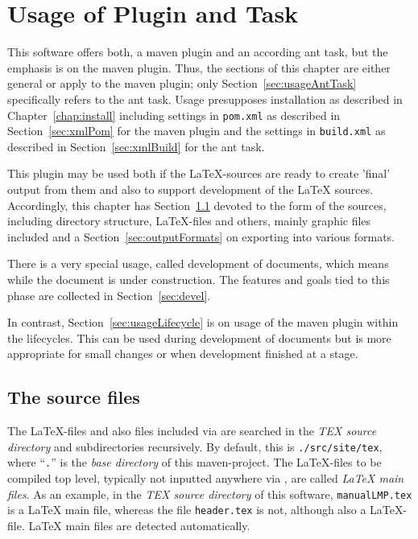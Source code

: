 
\chapter{Usage of Plugin and Task}\label{chap:usage}

This software offers both, a maven plugin and an according ant task,
but the emphasis is on the maven plugin.
Thus, the sections of this chapter are either general
or apply to the maven plugin;
only Section~\ref{sec:usageAntTask} specifically refers to the ant task. 
Usage presupposes installation as described in Chapter~\ref{chap:install}
including settings in \texttt{pom.xml} 
as described in Section~\ref{sec:xmlPom} for the maven plugin 
and the settings in \texttt{build.xml} 
as described in Section~\ref{sec:xmlBuild} for the ant task.

This plugin may be used both if the \LaTeX-sources are ready 
to create 'final' output from them 
and also to support development of the \LaTeX{} sources. 
Accordingly, this chapter has Section~\ref{sec:sources}
devoted to the form of the sources, including directory structure,
\LaTeX-files and others, mainly graphic files included
and a Section~\ref{sec:outputFormats} on exporting into various formats.

There is a very special usage, called development of documents,
which means while the document is under construction.
The features and goals tied to this phase
are collected in Section~\ref{sec:devel}.

In contrast, Section~\ref{sec:usageLifecycle}
is on usage of the maven plugin within the lifecycles.
This can be used during development of documents
but is more appropriate for small changes
or when development finished at a stage. 



\section{The source files}\label{sec:sources}

The \LaTeX-files and also files included via  
are searched in the \emph{TEX source directory} and subdirectories recursively. 
By default, this is \texttt{./src/site/tex}, 
where ``\texttt{.}'' is the \emph{base directory} of this maven-project. 
The \LaTeX-files to be compiled top level, 
typically not inputted anywhere via , 
are called \emph{\LaTeX{} main files}. 
As an example, 
in the \emph{TEX source directory} of this software, 
\texttt{manualLMP.tex} is a \LaTeX{} main file, 
whereas the file \texttt{header.tex} is not, although also a \LaTeX-file. 
\LaTeX{} main files are detected automatically. 

